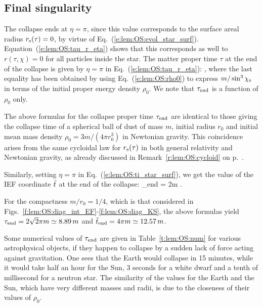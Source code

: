 \subsection{Final singularity}

The collapse ends at $\eta = \pi$, since this value corresponds to the surface
areal radius $r_{\rm s}(\tau) = 0$, by virtue of Eq.~(\ref{e:lem:OS:evol_star_surf}).
Equation~(\ref{e:lem:OS:tau_r_eta}) shows that this corresponds as well
to $r(\tau,\chi) = 0$ for all
particles inside the star. The matter proper time $\tau$ at the end of the collapse
is given by $\eta=\pi$ in Eq.~(\ref{e:lem:OS:tau_r_eta}):
\be \label{e:lem:OS:tau_end}
   ,
\ee
where the last equality has been obtained by using Eq.~(\ref{e:lem:OS:rho0})
to express $m/\sin^3\chi_{\rm s}$ in terms of the initial proper energy density $\rho_0$.
We note that $\tau_{\rm end}$ is a function of $\rho_0$ only.

\begin{remark}
The above formulas for the collapse proper time $\tau_{\rm end}$ are identical
to those giving the collapse time of a spherical ball of dust of mass $m$, initial radius
$r_0$ and initial mean mass density $\rho_0=3 m/(4\pi r_0^3)$ in Newtonian gravity.
This coincidence arises from the
same cycloidal law for $r_{\rm s}(\tau)$ in both general relativity and Newtonian gravity,
as already discussed in Remark~\ref{r:lem:OS:cycloid} on p.~\pageref{r:lem:OS:cycloid}.
\end{remark}

Similarly, setting $\eta=\pi$ in Eq.~(\ref{e:lem:OS:ti_star_surf}), we get the value
of the IEF coordinate ${\tilde t}$ at the end of the collapse:
\be
     \ti_{\rm end} = 2m  .
\ee
\begin{example} \label{x:lem:OS:tau_end_plot}
For the compactness $m/r_0 = 1/4$, which is that considered in Figs.~\ref{f:lem:OS:diag_int_EF}-\ref{f:lem:OS:diag_KS}, the above formulas yield
$\tau_{\rm end} = 2 \sqrt{2} \pi m \simeq 8.89\, m$ and
${\tilde t}_{\rm end} = 4 \pi m \simeq 12.57\, m$.
\end{example}

\begin{example} \label{x:lem:OS:tau_end_astro}
Some numerical values of $\tau_{\rm end}$ are given in Table~\ref{t:lem:OS:num} for
various astrophysical objects, if they happen to collapse by a sudden lack
of force acting against gravitation. One sees that the Earth
would collapse in 15 minutes, while it would take half an hour for the Sun,
3 seconds for a white dwarf and a tenth of millisecond for a neutron star.
The similarity of the values for the Earth and the Sun, which have very different
masses and radii, is due to the closeness of their values of $\rho_0$.
\end{example}


